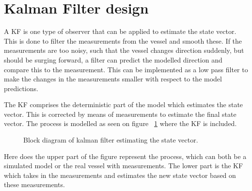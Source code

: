 \section{Kalman Filter design}

A \ac{KF} is one type of observer that can be applied to estimate the state vector. This is done to filter the measurements from the vessel and smooth these. If the measurements are too noisy, such that the vessel changes direction suddenly, but should be surging forward, a filter can predict the modelled direction and compare this to the measurement. This can be implemented as a low pass filter to make the changes in the measurements smaller with respect to the model predictions.

The \ac{KF} comprises the deterministic part of the model which estimates the state vector. This is corrected by means of measurements to estimate the final state vector. The process is modelled as seen on figure ~\ref{fig:blockkf} where the \ac{KF} is included.

\begin{figure}
	\centering
	
	\caption{Block diagram of kalman filter estimating the state vector.}
	\label{fig:blockkf}
\end{figure}

Here does the upper part of the figure represent the process, which can both be a simulated model or the real vessel with measurements. The lower part is the \ac{KF} which takes in the measurements and estimates the new state vector based on these measurements.

